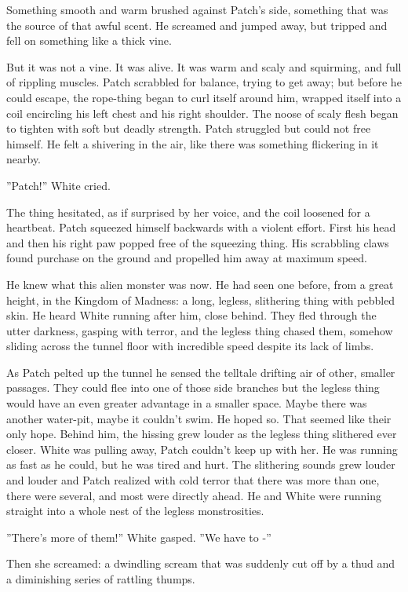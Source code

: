 \documentclass[12pt]{book}
\begin{document}
 Something smooth and warm brushed against Patch's side, something that was the source of that awful scent. He screamed and jumped away, but tripped and fell on something like a thick vine.\par
But it was not a vine. It was alive. It was warm and scaly and squirming, and full of rippling muscles. Patch scrabbled for balance, trying to get away; but before he could escape, the rope-thing began to curl itself around him, wrapped itself into a coil encircling his left chest and his right shoulder. The noose of scaly flesh began to tighten with soft but deadly strength. Patch struggled but could not free himself. He felt a shivering in the air, like there was something flickering in it nearby.\par
 ''Patch!'' White cried.\par
The thing hesitated, as if surprised by her voice, and the coil loosened for a heartbeat. Patch squeezed himself backwards with a violent effort. First his head and then his right paw popped free of the squeezing thing. His scrabbling claws found purchase on the ground and propelled him away at maximum speed.\par
 He knew what this alien monster was now. He had seen one before, from a great height, in the Kingdom of Madness: a long, legless, slithering thing with pebbled skin. He heard White running after him, close behind. They fled through the utter darkness, gasping with terror, and the legless thing chased them, somehow sliding across the tunnel floor with incredible speed despite its lack of limbs.\par
 As Patch pelted up the tunnel he sensed the telltale drifting air of other, smaller passages. They could flee into one of those side branches %
 but the legless thing would have an even greater advantage in a smaller space. Maybe there was another water-pit, maybe it couldn't swim. He hoped so. That seemed like their only hope. Behind him, the hissing grew louder as the legless thing slithered ever closer. White was pulling away, Patch couldn't keep up with her. He was running as fast as he could, but he was tired and hurt. The slithering sounds grew louder and louder %
 and Patch realized with cold terror that there was more than one, there were several, and most were directly ahead. He and White were running straight into a whole nest of the legless monstrosities.\par
 ''There's more of them!'' White gasped. ''We have to -''\par
 Then she screamed: a dwindling scream that was suddenly cut off by a thud and a diminishing series of rattling thumps.\par
\end{document}
